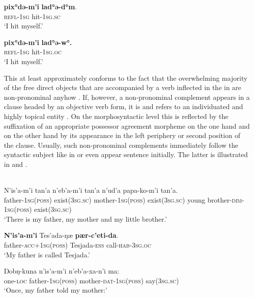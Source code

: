 \documentclass[output=paper]{LSP/langsci}
\begin{document}
\ea\label{12-wr-ex:19a} 
\gll \textbf{pix°də-m’i} \textbf{lad°ə-d°m}.\\
\textsc{refl-1sg} hit-1\textsc{sg.sc}\\
\glt  ‘I hit myself.’

\ex\label{12-wr-ex:19b} 
\gll \textbf{pix°də-m’i} \textbf{lad°ə-w°.}\\
\textsc{refl-1sg} hit-1\textsc{sg.oc}\\
\glt  ‘I hit myself.’
\z
\z

This at least approximately conforms to the fact that the overwhelming majority of the free direct objects that are accompanied by a verb inflected in the  in  are non-pronominal anyhow \citep[122]{Kortvely2005Verb}. If, however, a non-pronominal complement appears in a  clause headed by an objective verb form, it is  and refers to an individuated and highly topical entity \citep[125--139]{Dalrympleetal2011Objects}. 
On the morphosyntactic level this is reflected by the suffixation of an appropriate possessor agreement morpheme on the one hand and on the other hand by its appearance in the left periphery or second position of the clause.
Usually, such non-pronominal complements immediately follow the syntactic subject like in  or even appear  sentence initially. 
The latter is illustrated in  and . 

\ea \label{12-wr-ex:20}
\\

\ea \label{12-wr-ex:20a}
\gll N'is'a-m'i tan’a n’eb’a-m’i tan’a n’ud’a papa-ko-m’i tan’a.\\
father-\textsc{1sg(poss)} exist(\textsc{3sg.sc)} mother-\textsc{1sg(poss)} exist(\textsc{3sg.sc)} young brother-\textsc{dim-1sg(poss)} exist(\textsc{3sg.sc)}\\
\glt ‘There is my father, my mother and my little brother.’

\ex  \label{12-wr-ex:20b}
\gll \textbf{N'is'a-m'i} Tes’ada-ŋæ \textbf{pær-c’eti-da}.\\
father-\textsc{acc+1sg(poss)} Tesjada-\textsc{ess} call-\textsc{hab-3sg.oc}\\
\glt ‘My father is called Tesjada.’

\ex \label{12-wr-ex:20c}
\gll Ŋobŋ-kuna n’is’a-m’i n’eb’a-xa-n’i ma:\\
one-\textsc{loc} father-\textsc{1sg(poss)} mother-\textsc{dat-1sg(poss)} say\textsc{(3sg.sc)}\\
\glt ‘Once, my father told my mother:’
\end{document}
